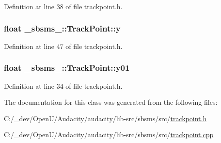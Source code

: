 Definition at line 38 of file trackpoint.\+h.

\subsubsection[{\texorpdfstring{y}{y}}]{\setlength{\rightskip}{0pt plus 5cm}float \+\_\+sbsms\+\_\+\+::\+Track\+Point\+::y\hspace{0.3cm}{\ttfamily [protected]}}\hypertarget{class__sbsms___1_1_track_point_a09a07b82ca2e04e64ea75deffeb7ff6f}{}\label{class__sbsms___1_1_track_point_a09a07b82ca2e04e64ea75deffeb7ff6f}


Definition at line 47 of file trackpoint.\+h.

\subsubsection[{\texorpdfstring{y01}{y01}}]{\setlength{\rightskip}{0pt plus 5cm}float \+\_\+sbsms\+\_\+\+::\+Track\+Point\+::y01\hspace{0.3cm}{\ttfamily [protected]}}\hypertarget{class__sbsms___1_1_track_point_a3dc3563437aecbf93acbe7c33dd114f9}{}\label{class__sbsms___1_1_track_point_a3dc3563437aecbf93acbe7c33dd114f9}


Definition at line 34 of file trackpoint.\+h.



The documentation for this class was generated from the following files\+:\begin{DoxyCompactItemize}
\item 
C\+:/\+\_\+dev/\+Open\+U/\+Audacity/audacity/lib-\/src/sbsms/src/\hyperlink{trackpoint_8h}{trackpoint.\+h}\item 
C\+:/\+\_\+dev/\+Open\+U/\+Audacity/audacity/lib-\/src/sbsms/src/\hyperlink{trackpoint_8cpp}{trackpoint.\+cpp}\end{DoxyCompactItemize}
